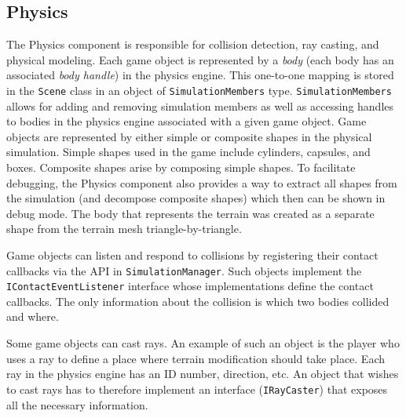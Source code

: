 \subsection{Physics}
The Physics component is responsible for collision detection, ray casting, and physical modeling.
Each game object is represented by a \textit{body} (each body has an associated \textit{body handle}) in the physics engine.
This one-to-one mapping is stored in the \texttt{Scene} class in an object of \texttt{SimulationMembers} type.
\texttt{SimulationMembers} allows for adding and removing simulation members as well as accessing handles to bodies in the physics engine associated with a given game object.
Game objects are represented by either simple or composite shapes in the physical simulation.
Simple shapes used in the game include cylinders, capsules, and boxes.
Composite shapes arise by composing simple shapes.
To facilitate debugging, the Physics component also provides a way to extract all shapes from the simulation (and decompose composite shapes) which then can be shown in debug mode.
The body that represents the terrain was created as a separate shape from the terrain mesh triangle-by-triangle.

Game objects can listen and respond to collisions by registering their contact callbacks via the API in \texttt{SimulationManager}.
Such objects implement the \texttt{IContactEventListener} interface whose implementations define the contact callbacks.
The only information about the collision is which two bodies collided and where.

Some game objects can cast rays.
An example of such an object is the player who uses a ray to define a place where terrain modification should take place.
Each ray in the physics engine has an ID number, direction, etc.
An object that wishes to cast rays has to therefore implement an interface (\texttt{IRayCaster}) that exposes all the necessary information.